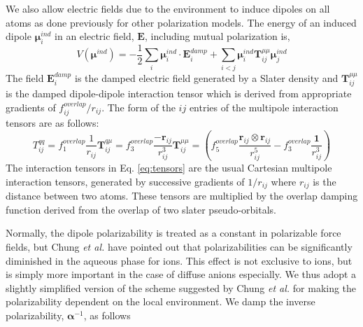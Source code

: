 \documentclass[journal=jctcce,manuscript=article]{achemso}
\begin{document}
We also allow electric fields due to the environment to induce dipoles on all atoms as done previously for other polarization models. The energy of an induced dipole $\bm{\mu}_i^{ind}$ in an electric field, $\bm{E}$, including mutual polarization is,
\begin{equation}
  V(\bm{\mu}^{ind})=-\frac12\sum_i \bm{\mu}_i^{ind}\cdot \bm{E}_i^{damp} + \sum_{i<j}\bm{\mu}^{ind}_i \bm{T}^{\mu\mu}_{ij}\bm{\mu}^{ind}_j
  \label{eq:induced_dipoles}
\end{equation}
The field $\bm{E}_i^{damp}$ is the damped electric field generated by a Slater density and $\bm{T}^{\mu\mu}_{ij}$ is the damped dipole-dipole interaction tensor which is derived from appropriate gradients of $f_{ij}^{overlap}/r_{ij}$. The form of the $ij$ entries of the multipole interaction tensors are as follows:
\begin{subequations}
  \begin{equation}
    T^{qq}_{ij}=f_1^{overlap}\frac{1}{r_{ij}}
    \label{eq:tensors_a}
  \end{equation}
  \begin{equation}
  \bm{T}^{q\mu}_{ij}=f_3^{overlap}\frac{-\bm{r}_{ij}}{r_{ij}^3}
    \label{eq:tensors_b}
  \end{equation}
  \begin{equation}
  \bm{T}^{\mu\mu}_{ij}=\left(f_5^{overlap}\frac{\bm{r}_{ij}\otimes\bm{r}_{ij}}{r_{ij}^5}-f_3^{overlap}\frac{\bm{1}}{r_{ij}^3}\right)
    \label{eq:tensors_c}
  \end{equation}
  \label{eq:tensors}
\end{subequations}
The interaction tensors in Eq. \ref{eq:tensors} are the usual Cartesian multipole interaction tensors, generated by successive gradients of $1/r_{ij}$ where $r_{ij}$ is the distance between two atoms. These tensors are multiplied by the overlap damping function derived from the overlap of two slater pseudo-orbitals\cite{rackers2021polarizable}.

Normally, the dipole polarizability is treated as a constant in polarizable force fields, but Chung \textit{et al.} have pointed out that polarizabilities can be significantly diminished in the aqueous phase for ions.\cite{chung2022classical} This effect is not exclusive to ions, but is simply more important in the case of diffuse anions especially. We thus adopt a slightly simplified version of the scheme suggested by Chung \textit{et al.} for making the polarizability dependent on the local environment. We damp the inverse polarizability, $\bm{\alpha}^{-1}$, as follows
\end{document}
